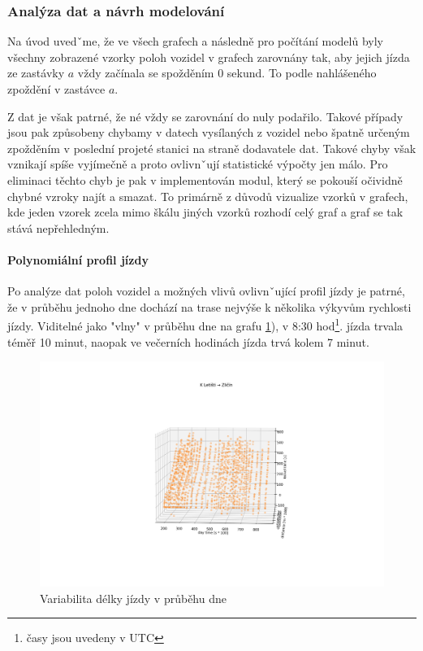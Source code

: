 \subsubsection{Analýza dat a návrh modelování} \label{subsubsection:analyza_dat}

Na úvod uvedˇme, že ve všech grafech a následně pro počítání modelů byly všechny zobrazené vzorky poloh vozidel v grafech zarovnány tak, aby jejich jízda ze zastávky $a$ vždy začínala se spožděním 0 sekund. To podle nahlášeného zpoždění v zastávce $a$.

\bigbreak

Z dat je však patrné, že né vždy se zarovnání do nuly podařilo. Takové případy jsou pak způsobeny chybamy v datech vysílaných z vozidel nebo špatně určeným zpožděním v poslední projeté stanici na straně dodavatele dat. Takové chyby však vznikají spíše vyjímečně a proto ovlivnˇují statistické výpočty jen málo. Pro eliminaci těchto chyb je pak v implementován modul, který se pokouší očividně chybné vzroky najít a smazat. To primárně z důvodů vizualize vzorků v grafech, kde jeden vzorek zcela mimo škálu jiných vzorků rozhodí celý graf a graf se tak stává nepřehledným.

\paragraph{Polynomiální profil jízdy}

Po analýze dat poloh vozidel a možných vlivů ovlivnˇující profil jízdy je patrné, že v průběhu jednoho dne dochází na trase nejvýše k několika výkyvům rychlosti jízdy. Viditelné jako "vlny" v průběhu dne na grafu \ref{fig:dojezd_ve_fazich_dne}), v 8:30 hod\footnote{časy jsou uvedeny v UTC}. jízda trvala téměř 10 minut, naopak ve večerních hodinách jízda trvá kolem 7 minut.

\begin{figure}
	\centering
  \includegraphics[width=\linewidth]{../img/dojezd_ve_fazich_dne.png}
  \caption{Variabilita délky jízdy v průběhu dne}
  \label{fig:dojezd_ve_fazich_dne}
\end{figure}

